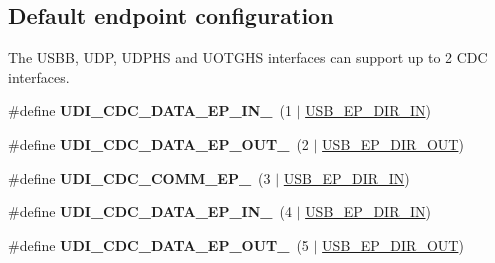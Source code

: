 \subsection*{Default endpoint configuration}
\label{_amgrpfeefcd6a14e97a2b99456a3d0ac882cb}%
 The U\-S\-B\-B, U\-D\-P, U\-D\-P\-H\-S and U\-O\-T\-G\-H\-S interfaces can support up to 2 C\-D\-C interfaces. \begin{DoxyCompactItemize}
\item 
\hypertarget{group__udi__cdc__group__single__desc_ga5aa2ea29be14f30efe861f8fb2b57041}{\#define {\bfseries U\-D\-I\-\_\-\-C\-D\-C\-\_\-\-D\-A\-T\-A\-\_\-\-E\-P\-\_\-\-I\-N\-\_}~(1 $|$ \hyperlink{group__usb__protocol__group_gaae8411e95f26738326bc25a0161dde99}{U\-S\-B\-\_\-\-E\-P\-\_\-\-D\-I\-R\-\_\-\-I\-N})}\label{group__udi__cdc__group__single__desc_ga5aa2ea29be14f30efe861f8fb2b57041}

\item 
\hypertarget{group__udi__cdc__group__single__desc_ga58651b4198deb73eb64002ffdb268add}{\#define {\bfseries U\-D\-I\-\_\-\-C\-D\-C\-\_\-\-D\-A\-T\-A\-\_\-\-E\-P\-\_\-\-O\-U\-T\-\_}~(2 $|$ \hyperlink{group__usb__protocol__group_ga0510b0a04d9cef144e4d9793310abccf}{U\-S\-B\-\_\-\-E\-P\-\_\-\-D\-I\-R\-\_\-\-O\-U\-T})}\label{group__udi__cdc__group__single__desc_ga58651b4198deb73eb64002ffdb268add}

\item 
\hypertarget{group__udi__cdc__group__single__desc_ga578e3200ca7fb6ef694e465e04653572}{\#define {\bfseries U\-D\-I\-\_\-\-C\-D\-C\-\_\-\-C\-O\-M\-M\-\_\-\-E\-P\-\_}~(3 $|$ \hyperlink{group__usb__protocol__group_gaae8411e95f26738326bc25a0161dde99}{U\-S\-B\-\_\-\-E\-P\-\_\-\-D\-I\-R\-\_\-\-I\-N})}\label{group__udi__cdc__group__single__desc_ga578e3200ca7fb6ef694e465e04653572}

\item 
\hypertarget{group__udi__cdc__group__single__desc_ga0386772c35ae2b7dd579fdae90e3ede4}{\#define {\bfseries U\-D\-I\-\_\-\-C\-D\-C\-\_\-\-D\-A\-T\-A\-\_\-\-E\-P\-\_\-\-I\-N\-\_}~(4 $|$ \hyperlink{group__usb__protocol__group_gaae8411e95f26738326bc25a0161dde99}{U\-S\-B\-\_\-\-E\-P\-\_\-\-D\-I\-R\-\_\-\-I\-N})}\label{group__udi__cdc__group__single__desc_ga0386772c35ae2b7dd579fdae90e3ede4}

\item 
\hypertarget{group__udi__cdc__group__single__desc_ga94ee4c3472eae7ca401adc2f234d4b3d}{\#define {\bfseries U\-D\-I\-\_\-\-C\-D\-C\-\_\-\-D\-A\-T\-A\-\_\-\-E\-P\-\_\-\-O\-U\-T\-\_}~(5 $|$ \hyperlink{group__usb__protocol__group_ga0510b0a04d9cef144e4d9793310abccf}{U\-S\-B\-\_\-\-E\-P\-\_\-\-D\-I\-R\-\_\-\-O\-U\-T})}\label{group__udi__cdc__group__single__desc_ga94ee4c3472eae7ca401adc2f234d4b3d}


\end{DoxyCompactItemize}
